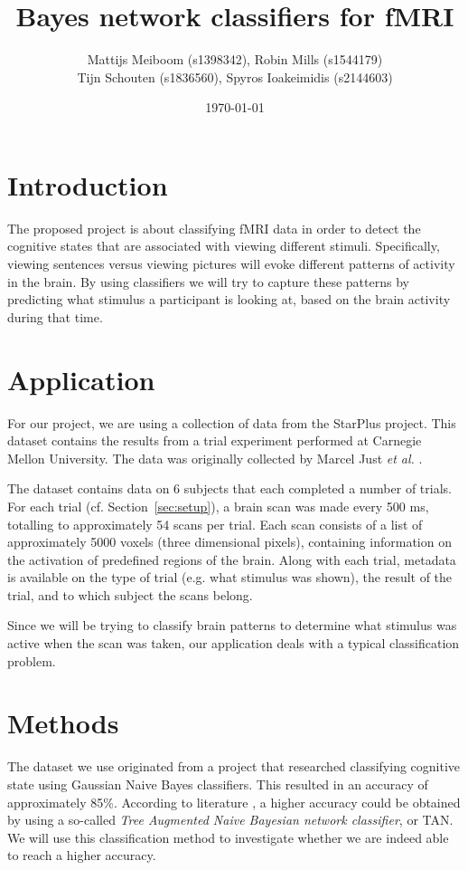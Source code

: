 \documentclass[a4paper, 11pt]{scrartcl}
\title{\Large Bayes network classifiers for fMRI}
\author{\small Mattijs Meiboom (s1398342), Robin Mills (s1544179)\\
			\small Tijn Schouten (s1836560), Spyros Ioakeimidis (s2144603)}
\date{\small \today}
\begin{document}
\maketitle

\thispagestyle{empty}

\section{Introduction}

The proposed project is about classifying fMRI data in order to detect the cognitive states that are associated with viewing different stimuli. Specifically, viewing sentences versus viewing pictures will evoke different patterns of activity in the brain. By using classifiers we will try to capture these patterns by predicting what stimulus a participant is looking at, based on the brain activity during that time.

\section{Application}
\label{sec:application}

For our project, we are using a collection of data from the StarPlus project. This dataset contains the results from a trial experiment performed at Carnegie Mellon University. The data was originally collected by Marcel Just \emph{et al.} \cite{StarPlus:2004kx}.

The dataset contains data on 6 subjects that each completed a number of trials. For each trial (cf. Section~\ref{sec:setup}), a brain scan was made every 500 ms, totalling to approximately 54 scans per trial. Each scan consists of a list of approximately 5000 voxels (three dimensional pixels), containing information on the activation of predefined regions of the brain. Along with each trial, metadata is available on the type of trial (e.g. what stimulus was shown), the result of the trial, and to which subject the scans belong.

Since we will be trying to classify brain patterns to determine what stimulus was active when the scan was taken, our application deals with a typical classification problem.

\section{Methods}
\label{sec:methods}

The dataset we use originated from a project that researched classifying cognitive state using Gaussian Naive Bayes classifiers. This resulted in an accuracy of approximately 85\%. According to literature \cite{Friedman:1997gw}, a higher accuracy could be obtained by using a so-called \emph{Tree Augmented Naive Bayesian network classifier}, or TAN. We will use this classification method to investigate whether we are indeed able to reach a higher accuracy.
\end{document}
